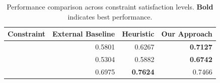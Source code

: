 \begin{table}[htbp]
\centering
\caption{Performance comparison across constraint satisfaction levels. \textbf{Bold} indicates best performance.}
\label{tab:all_constraints_comparison}
\begin{tabular}{lrrr}
\toprule
Constraint & External Baseline & Heuristic & Our Approach \\
\midrule
[0.5, 0.3] & 0.5801 & 0.6267 & \textbf{0.7127} \\
[0.8, 0.2] & 0.5304 & 0.5882 & \textbf{0.6742} \\
[0.9, 0.8] & 0.6975 & \textbf{0.7624} & 0.7466 \\
\bottomrule
\end{tabular}
\end{table}